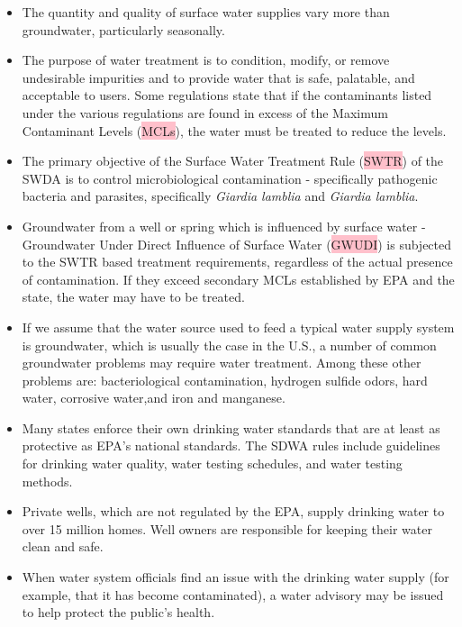 \begin{itemize}
\item The quantity and quality of surface water supplies vary more than groundwater, particularly seasonally.

\item The purpose of water treatment is to condition, modify, or remove undesirable impurities and to provide water that is safe, palatable, and acceptable to users. Some regulations state that if the contaminants listed under the various regulations are found in excess of the Maximum Contaminant Levels (\colorbox{pink}{MCLs}), the water must be treated to reduce the levels. 

\item The primary objective of the Surface Water Treatment Rule (\colorbox{pink}{SWTR}) of the SWDA is to control microbiological contamination - specifically pathogenic bacteria and parasites, specifically \textit{Giardia lamblia} and \textit{Giardia lamblia}.

\item Groundwater from a well or spring which is influenced by surface water - Groundwater Under Direct Influence of Surface Water (\colorbox{pink}{GWUDI}) is subjected to the SWTR based treatment requirements, regardless of the actual presence of contamination. If they exceed secondary MCLs established by EPA and the state, the water may have to be treated. 

\item If we assume that the water source used to feed a typical water supply system is groundwater, which is usually the case in the U.S., a number of common groundwater problems may require water treatment. Among these other problems are: bacteriological contamination, hydrogen sulfide odors, hard water, corrosive water,and iron and manganese.

\item Many states enforce their own drinking water standards that are at least as protective as EPA’s national standards. The SDWA rules include guidelines for drinking water quality, water testing schedules, and water testing methods.

\item Private wells, which are not regulated by the EPA, supply drinking water to over 15 million homes. Well owners are responsible for keeping their water clean and safe.

\item When water system officials find an issue with the drinking water supply (for example, that it has become contaminated), a water advisory may be issued to help protect the public’s health.


\end{itemize}
